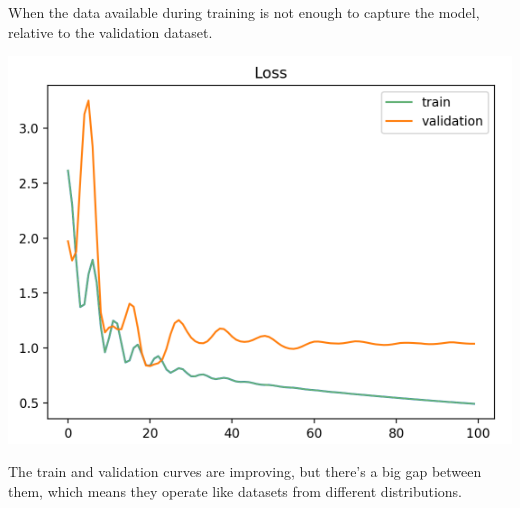 \documentclass[letterpaper, 10.5pt,landscape]{article}
\begin{document}
\begin{multicols*}{3}
When the data available during training is not enough to capture the model, relative to the validation dataset.

\vspace{-3mm}
\begin{center}
    \begin{minipage}{0.5\linewidth}
        \includegraphics[width=\textwidth]{figures/Unrepresentative_Training_Dataset.PNG}
    \end{minipage} 
\end{center}
\vspace{-3mm}






The train and validation curves are improving, but there’s a big gap between them, which means they operate like datasets from different distributions.


\end{multicols*}
\end{document}
